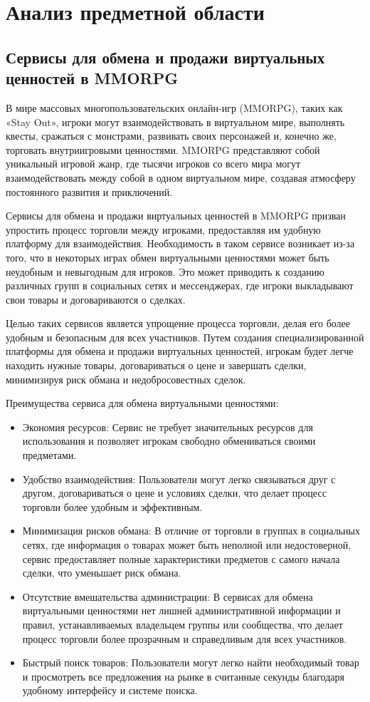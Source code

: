\section{Анализ предметной области}
\subsection{Сервисы для обмена и продажи виртуальных ценностей в MMORPG}

В мире массовых многопользовательских онлайн-игр (MMORPG), таких как «Stay Out», игроки могут взаимодействовать в виртуальном мире, выполнять квесты, сражаться с монстрами, развивать своих персонажей и, конечно же, торговать внутриигровыми ценностями. MMORPG представляют собой уникальный игровой жанр, где тысячи игроков со всего мира могут взаимодействовать между собой в одном виртуальном мире, создавая атмосферу постоянного развития и приключений.

Сервисы для обмена и продажи виртуальных ценностей в MMORPG призван упростить процесс торговли между игроками, предоставляя им удобную платформу для взаимодействия. Необходимость в таком сервисе возникает из-за того, что в некоторых играх обмен виртуальными ценностями может быть неудобным и невыгодным для игроков. Это может приводить к созданию различных групп в социальных сетях и мессенджерах, где игроки выкладывают свои товары и договариваются о сделках.

Целью таких сервисов является упрощение процесса торговли, делая его более удобным и безопасным для всех участников. Путем создания специализированной платформы для обмена и продажи виртуальных ценностей, игрокам будет легче находить нужные товары, договариваться о цене и завершать сделки, минимизируя риск обмана и недобросовестных сделок.

Преимущества сервиса для обмена виртуальными ценностями:
\begin{itemize}
	\item Экономия ресурсов: Сервис не требует значительных ресурсов для использования и позволяет игрокам свободно обмениваться своими предметами.
	\item Удобство взаимодействия: Пользователи могут легко связываться друг с другом, договариваться о цене и условиях сделки, что делает процесс торговли более удобным и эффективным.
	\item Минимизация рисков обмана: В отличие от торговли в группах в социальных сетях, где информация о товарах может быть неполной или недостоверной, сервис предоставляет полные характеристики предметов с самого начала сделки, что уменьшает риск обмана.
	\item Отсутствие вмешательства администрации: В сервисах для обмена виртуальными ценностями нет лишней административной информации и правил, устанавливаемых владельцем группы или сообщества, что делает процесс торговли более прозрачным и справедливым для всех участников.
	\item Быстрый поиск товаров: Пользователи могут легко найти необходимый товар и просмотреть все предложения на рынке в считанные секунды благодаря удобному интерфейсу и системе поиска.
\end{itemize}
